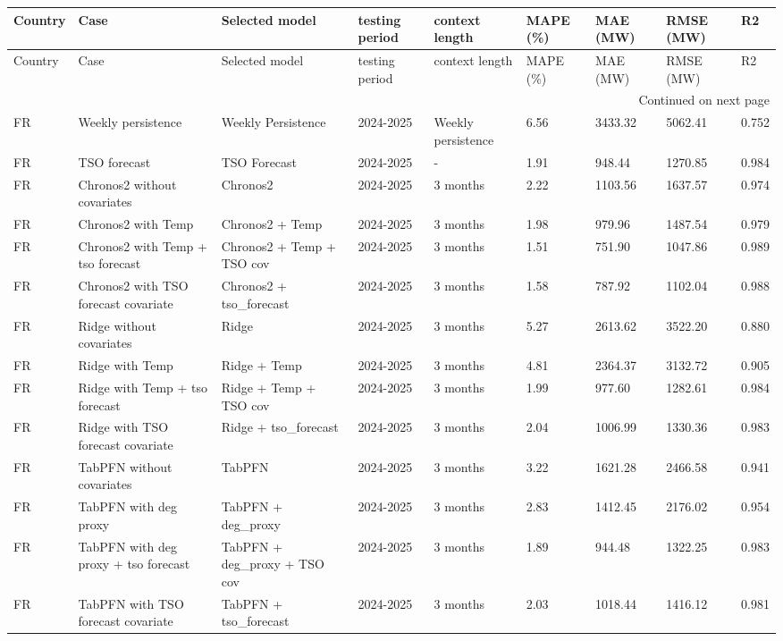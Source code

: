 \begin{longtable}{lllllllll}
\toprule
Country & Case & Selected model & testing period & context length & MAPE (\%) & MAE (MW) & RMSE (MW) & R2 \\
\midrule
\endfirsthead
\toprule
Country & Case & Selected model & testing period & context length & MAPE (\%) & MAE (MW) & RMSE (MW) & R2 \\
\midrule
\endhead
\midrule
\multicolumn{9}{r}{Continued on next page} \\
\midrule
\endfoot
\bottomrule
\endlastfoot
FR & Weekly persistence & Weekly Persistence & 2024-2025 & Weekly persistence & 6.56 & 3433.32 & 5062.41 & 0.752 \\
FR & TSO forecast & TSO Forecast & 2024-2025 & - & 1.91 & 948.44 & 1270.85 & 0.984 \\
FR & Chronos2 without covariates & Chronos2 & 2024-2025 & 3 months & 2.22 & 1103.56 & 1637.57 & 0.974 \\
FR & Chronos2 with Temp & Chronos2 + Temp & 2024-2025 & 3 months & 1.98 & 979.96 & 1487.54 & 0.979 \\
FR & Chronos2 with Temp + tso forecast & Chronos2 + Temp + TSO cov & 2024-2025 & 3 months & 1.51 & 751.90 & 1047.86 & 0.989 \\
FR & Chronos2 with TSO forecast covariate & Chronos2 + tso\_forecast & 2024-2025 & 3 months & 1.58 & 787.92 & 1102.04 & 0.988 \\
FR & Ridge without covariates & Ridge & 2024-2025 & 3 months & 5.27 & 2613.62 & 3522.20 & 0.880 \\
FR & Ridge with Temp & Ridge + Temp & 2024-2025 & 3 months & 4.81 & 2364.37 & 3132.72 & 0.905 \\
FR & Ridge with Temp + tso forecast & Ridge + Temp + TSO cov & 2024-2025 & 3 months & 1.99 & 977.60 & 1282.61 & 0.984 \\
FR & Ridge with TSO forecast covariate & Ridge + tso\_forecast & 2024-2025 & 3 months & 2.04 & 1006.99 & 1330.36 & 0.983 \\
FR & TabPFN without covariates & TabPFN & 2024-2025 & 3 months & 3.22 & 1621.28 & 2466.58 & 0.941 \\
FR & TabPFN with deg proxy & TabPFN + deg\_proxy & 2024-2025 & 3 months & 2.83 & 1412.45 & 2176.02 & 0.954 \\
FR & TabPFN with deg proxy + tso forecast & TabPFN + deg\_proxy + TSO cov & 2024-2025 & 3 months & 1.89 & 944.48 & 1322.25 & 0.983 \\
FR & TabPFN with TSO forecast covariate & TabPFN + tso\_forecast & 2024-2025 & 3 months & 2.03 & 1018.44 & 1416.12 & 0.981 \\
\end{longtable}
